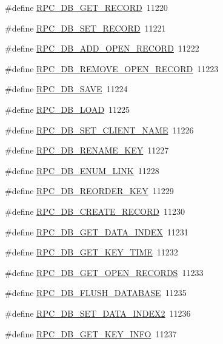 \begin{DoxyCompactItemize}
\item 
\#define \hyperlink{group__mrpcdefineh_gafffa6050c2cbd0f3597fa57462178825}{RPC\_\-DB\_\-GET\_\-RECORD}~11220
\item 
\#define \hyperlink{group__mrpcdefineh_gae9ad48800bf41aa6ae8c3ade34953033}{RPC\_\-DB\_\-SET\_\-RECORD}~11221
\item 
\#define \hyperlink{group__mrpcdefineh_ga009689a06b30a501cff2aafefb18287a}{RPC\_\-DB\_\-ADD\_\-OPEN\_\-RECORD}~11222
\item 
\#define \hyperlink{group__mrpcdefineh_ga670adcfd772ae7332397e6e2fd279018}{RPC\_\-DB\_\-REMOVE\_\-OPEN\_\-RECORD}~11223
\item 
\#define \hyperlink{group__mrpcdefineh_gadb19d2a6b51b4fe39ffe61e6299ad8d2}{RPC\_\-DB\_\-SAVE}~11224
\item 
\#define \hyperlink{group__mrpcdefineh_ga0f99b5451f0d689532438b773b271d4f}{RPC\_\-DB\_\-LOAD}~11225
\item 
\#define \hyperlink{group__mrpcdefineh_ga5e2400a5528a9d3640e28e80291ffcfe}{RPC\_\-DB\_\-SET\_\-CLIENT\_\-NAME}~11226
\item 
\#define \hyperlink{group__mrpcdefineh_ga6cd24f7da4784947e81c378cd7512d0d}{RPC\_\-DB\_\-RENAME\_\-KEY}~11227
\item 
\#define \hyperlink{group__mrpcdefineh_ga1a6c32657e096d90309072b8baaf6a61}{RPC\_\-DB\_\-ENUM\_\-LINK}~11228
\item 
\#define \hyperlink{group__mrpcdefineh_gaa4127b862cc0f07d7b5e708174f04343}{RPC\_\-DB\_\-REORDER\_\-KEY}~11229
\item 
\#define \hyperlink{group__mrpcdefineh_ga0b3e6435045e5a87b0e72ce6c33990e0}{RPC\_\-DB\_\-CREATE\_\-RECORD}~11230
\item 
\#define \hyperlink{group__mrpcdefineh_gab80c89111861b0429b50a67a90fc7ec8}{RPC\_\-DB\_\-GET\_\-DATA\_\-INDEX}~11231
\item 
\#define \hyperlink{group__mrpcdefineh_gae639d2fe4b40ca265f5160e1e5b091f7}{RPC\_\-DB\_\-GET\_\-KEY\_\-TIME}~11232
\item 
\#define \hyperlink{group__mrpcdefineh_gaeeb4e8c8ada85be560a691277ed41245}{RPC\_\-DB\_\-GET\_\-OPEN\_\-RECORDS}~11233
\item 
\#define \hyperlink{group__mrpcdefineh_gacd06ddba06cde7c0cd823893e69a3019}{RPC\_\-DB\_\-FLUSH\_\-DATABASE}~11235
\item 
\#define \hyperlink{group__mrpcdefineh_gaede33e3680ff32d184b45c57f19ea0a2}{RPC\_\-DB\_\-SET\_\-DATA\_\-INDEX2}~11236
\item 
\#define \hyperlink{group__mrpcdefineh_gabcf7f2678a2ee27a0c9d58d9246d2ed0}{RPC\_\-DB\_\-GET\_\-KEY\_\-INFO}~11237

\end{DoxyCompactItemize}
